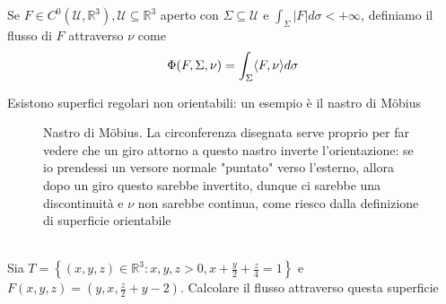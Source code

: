 \begin{definition}
	Se $F \in C^0(\mathcal{U}, \mathbb{R}^3), \mathcal{U} \subseteq \mathbb{R}^3$ aperto con $\Sigma \subseteq \mathcal{U}$ e $\int_\Sigma |F|d\sigma < +\infty$, definiamo il flusso di $F$ attraverso $\nu$ come
	$$
	\Phi(F, \Sigma, \nu) = \int_\Sigma \langle F, \nu \rangle d\sigma
	$$
\end{definition}
\begin{remark}
	Esistono superfici regolari non orientabili: un esempio è il nastro di Möbius
	\begin{figure}[H]
		\centering
		  \caption{Nastro di Möbius. La circonferenza disegnata serve proprio per far vedere che un giro attorno a questo nastro inverte l'orientazione: se io prendessi un versore normale "puntato" verso l'esterno, allora dopo un giro questo sarebbe invertito, dunque ci sarebbe una discontinuità e $\nu$ non sarebbe continua,
		  come riesco dalla definizione di superficie orientabile}
	\end{figure}
\end{remark}
\begin{example} \hspace{1cm} \\
	Sia $T=\left\{(x, y, z) \in \mathbb{R}^3: x, y, z > 0, x + \frac{y}{2}+\frac{z}{4}=1 \right\}$ e $F(x, y, z)=(y, x, \frac{z}{2}+ y - 2)$. Calcolare il flusso attraverso questa superficie
\end{example}
